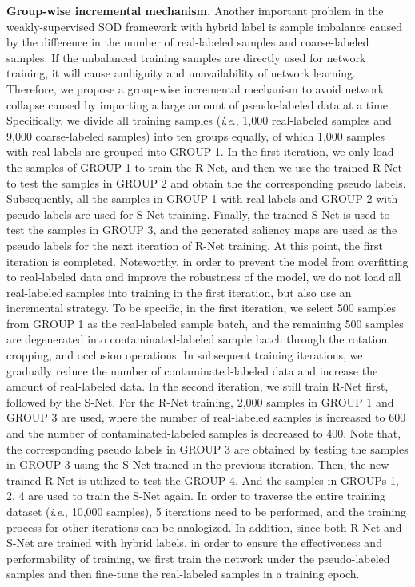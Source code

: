 \documentclass[journal]{IEEEtran}
\newcommand{\ie}{\textit{i}.\textit{e}.}
\begin{document}
\textbf{Group-wise incremental mechanism.}
Another important problem in the weakly-supervised SOD framework with hybrid label is sample imbalance caused by the difference in the number of real-labeled samples and coarse-labeled samples.
If the unbalanced training samples are directly used for network training, it will cause ambiguity and unavailability of network learning. Therefore, we propose a group-wise incremental mechanism to avoid network collapse caused by importing a large amount of pseudo-labeled data at a time. Specifically, we divide all training samples (\ie, 1,000 real-labeled samples and 9,000 coarse-labeled samples) into ten groups equally, of which 1,000 samples with real labels are grouped into GROUP 1.
In the first iteration, we only load the samples of GROUP 1 to train the R-Net, and then we use the trained R-Net to test the samples in GROUP 2 and obtain the the corresponding pseudo labels.
Subsequently, all the samples in GROUP 1 with real labels and GROUP 2 with pseudo labels are used for S-Net training.
Finally, the trained S-Net is used to test the samples in GROUP 3, and the generated saliency maps are used as the pseudo labels for the next iteration of R-Net training. At this point, the first iteration is completed.
Noteworthy, in order to prevent the model from overfitting to real-labeled data and improve the robustness of the model, we do not load all real-labeled samples into training in the first iteration, but also use an incremental strategy.
To be specific, in the first iteration, we select 500 samples from GROUP 1 as the real-labeled sample batch, and the remaining 500 samples are degenerated into contaminated-labeled sample batch through the rotation, cropping, and occlusion operations. In subsequent training iterations, we gradually reduce the number of contaminated-labeled data and increase the amount of real-labeled data.
In the second iteration, we still train R-Net first, followed by the S-Net.
For the R-Net training, 2,000 samples in GROUP 1 and GROUP 3 are used, where the number of real-labeled samples is increased to 600 and the number of contaminated-labeled samples is decreased to 400.
Note that, the corresponding pseudo labels in GROUP 3 are obtained by testing the samples in GROUP 3 using the S-Net trained in the previous iteration.
Then, the new trained R-Net is utilized to test the GROUP 4. And the samples in GROUPs 1, 2, 4 are used to train the S-Net again.
In order to traverse the entire training dataset (\ie, 10,000 samples), 5 iterations need to be performed, and the training process for other iterations can be analogized.
In addition, since both R-Net and S-Net are trained with hybrid labels, in order to ensure the effectiveness and performability of training, we first train the network under the pseudo-labeled samples and then fine-tune the real-labeled samples in a training epoch.
\end{document}
